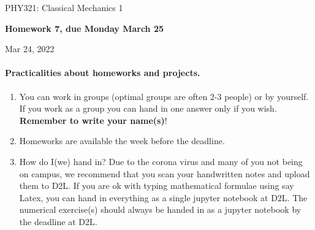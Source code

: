 \documentclass[%
oneside,                 %
final,                   %
10pt]{article}
\begin{document}

\newcommand{\exercisesection}[1]{\subsection*{#1}}






\thispagestyle{empty}

\begin{center}
{\LARGE\bf
\begin{spacing}{1.25}
PHY321: Classical Mechanics 1
\end{spacing}
}
\end{center}


\begin{center}
{\bf Homework 7, due Monday  March 25${}^{}$} \\ [0mm]
\end{center}

\begin{center}
\end{center}
    

\begin{center}
Mar 24, 2022
\end{center}

\vspace{1cm}


\paragraph{Practicalities about  homeworks and projects.}
\begin{enumerate}
\item You can work in groups (optimal groups are often 2-3 people) or by yourself. If you work as a group you can hand in one answer only if you wish. \textbf{Remember to write your name(s)}!

\item Homeworks are available  the week before the deadline. 

\item How do I(we)  hand in?  Due to the corona virus and many of you not being on campus, we recommend that you scan your handwritten notes and upload them to D2L. If you are ok with typing mathematical formulae using say Latex, you can hand in everything as a single jupyter notebook at D2L. The numerical exercise(s) should always be handed in as a jupyter notebook by the deadline at D2L. 
\end{enumerate}
\end{document}
